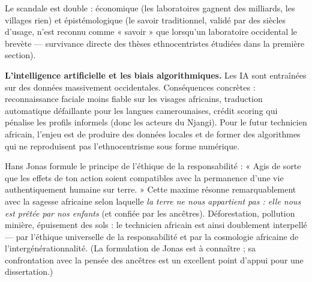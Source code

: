 \documentclass[11pt]{article}
\newcommand{\cle}[1]{{\popxbold\color{popdark}#1}}
\begin{document}
Le scandale est double : économique (les laboratoires gagnent des milliards, les villages rien) et épistémologique (le savoir traditionnel, validé par des siècles d'usage, n'est reconnu comme « savoir » que lorsqu'un laboratoire occidental le brevète — survivance directe des thèses ethnocentristes étudiées dans la première section).

\textbf{L'intelligence artificielle et les biais algorithmiques.} Les IA sont entraînées sur des données massivement occidentales. Conséquences concrètes : reconnaissance faciale moins fiable sur les visages africains, traduction automatique défaillante pour les langues camerounaises, crédit scoring qui pénalise les profils informels (donc les acteurs du Njangi). Pour le futur technicien africain, l'enjeu est de produire des \cle{données locales} et de former des algorithmes qui ne reproduisent pas l'ethnocentrisme sous forme numérique.

\begin{propriete}
Hans Jonas formule le principe de l'éthique de la responsabilité : « Agis de sorte que les effets de ton action soient compatibles avec la permanence d'une vie authentiquement humaine sur terre. » Cette maxime résonne remarquablement avec la sagesse africaine selon laquelle \emph{la terre ne nous appartient pas : elle nous est prêtée par nos enfants} (et confiée par les ancêtres). Déforestation, pollution minière, épuisement des sols : le technicien africain est ainsi doublement interpellé — par l'éthique universelle de la responsabilité et par la cosmologie africaine de l'intergénérationnalité. (La formulation de Jonas est à connaître ; sa confrontation avec la pensée des ancêtres est un excellent point d'appui pour une dissertation.)
\end{propriete}
\end{document}
